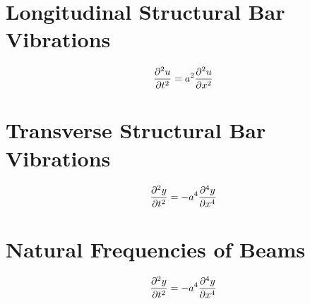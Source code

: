 \documentclass[class=report, 12pt, crop=false]{standalone}
\begin{document}
\begin{center}
\chapter{Longitudinal Structural Bar Vibrations}
\begin{comment}
Structural Archives
\end{comment}
$$\frac{\partial^2 u}{\partial t^2} = a^2\frac{\partial^2 u}{\partial x^2}$$
\chapter{Transverse Structural Bar Vibrations}
\begin{comment}
Structural Archives
\end{comment}
$$\frac{\partial^2 y}{\partial t^2} = -a^4\frac{\partial^4 y}{\partial x^4}$$
\chapter{Natural Frequencies of Beams}
\begin{comment}
Structural Archives
\end{comment}
$$\frac{\partial^2 y}{\partial t^2} = -a^4\frac{\partial^4 y}{\partial x^4}$$
\end{center}
\end{document}
